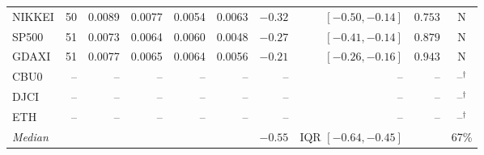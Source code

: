 \begin{tabular}{lrrrrrrrrc}
  NIKKEI & 50 & 0.0089 & 0.0077 & 0.0054 & 0.0063 & $-0.32$ & $[-0.50, -0.14]$ & $0.753$ & N \\
  SP500 & 51 & 0.0073 & 0.0064 & 0.0060 & 0.0048 & $-0.27$ & $[-0.41, -0.14]$ & $0.879$ & N \\
  GDAXI & 51 & 0.0077 & 0.0065 & 0.0064 & 0.0056 & $-0.21$ & $[-0.26, -0.16]$ & $0.943$ & N \\
\midrule
  CBU0 & -- & -- & -- & -- & -- & -- & -- & -- & --$^{\dagger}$ \\
  DJCI & -- & -- & -- & -- & -- & -- & -- & -- & --$^{\dagger}$ \\
  ETH & -- & -- & -- & -- & -- & -- & -- & -- & --$^{\dagger}$ \\
\midrule
  \textit{Median} & & & & & & $-0.55$ & IQR $[-0.64,-0.45]$ & & 67\% \\
\bottomrule
\end{tabular}